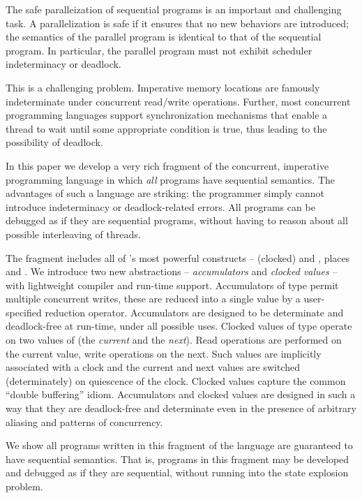 
The safe paralleization of sequential programs is an important and
challenging task. A parallelization is safe if it ensures that no new
behaviors are introduced; the semantics of the parallel program is
identical to that of the sequential program. In particular, the
parallel program must not exhibit scheduler indeterminacy or deadlock.

This is a challenging problem.  Imperative memory locations are
famously indeterminate under concurrent read/write
operations. Further, most concurrent programming languages support
synchronization mechanisms that enable a thread to wait until some
appropriate condition is true, thus leading to the possibility of
deadlock.

In this paper we develop a very rich fragment of the concurrent,
imperative programming language \Xten{} in which {\em all} programs
have sequential semantics. The advantages of such a language are
striking: the programmer simply cannot introduce indeterminacy or
deadlock-related errors. All programs can be debugged as if they are
sequential programs, without having to reason about all possible
interleaving of threads.

The fragment includes all of \Xten{}'s most powerful constructs --
(clocked)  and , places and {}. We
introduce two new abstractions -- {\em accumulators} and {\em clocked
  values} -- with lightweight compiler and run-time
support. Accumulators of type  permit multiple concurrent
writes, these are reduced into a single value by a user-specified
reduction operator. Accumulators are designed to be determinate and
deadlock-free at run-time, under all possible uses.  Clocked values of
type  operate on two values of  (the {\em current} and
the {\em next}). Read operations are performed on the current value,
write operations on the next. Such values are implicitly associated
with a clock and the current and next values are switched
(determinately) on quiescence of the clock. Clocked values capture the
common ``double buffering'' idiom. Accumulators and clocked values are
designed in such a way that they are deadlock-free and determinate
even in the presence of arbitrary aliasing and patterns of
concurrency.

We show all programs written in this fragment of the language are
guaranteed to have sequential semantics. That is, programs in this
fragment may be developed and debugged as if they are sequential,
without running into the state explosion problem.

